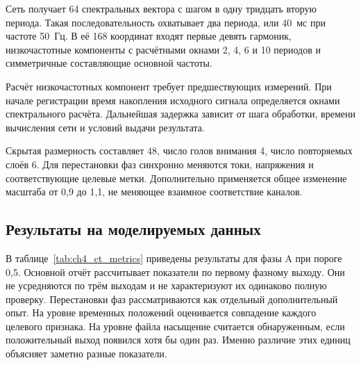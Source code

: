 Сеть получает 64 спектральных вектора с шагом в одну тридцать вторую периода. Такая
последовательность охватывает два периода, или 40~мс при частоте 50~Гц. В её 168
координат входят первые девять гармоник, низкочастотные компоненты с расчётными окнами
2, 4, 6 и 10 периодов и симметричные составляющие основной частоты.

Расчёт низкочастотных компонент требует предшествующих измерений. При начале регистрации
время накопления исходного сигнала определяется окнами спектрального расчёта. Дальнейшая
задержка зависит от шага обработки, времени вычисления сети и условий выдачи результата.

Скрытая размерность составляет 48,
число голов внимания 4, число повторяемых слоёв 6.
Для перестановки фаз синхронно меняются токи,
напряжения и соответствующие целевые метки.
Дополнительно применяется общее изменение масштаба
от 0,9 до 1,1, не меняющее взаимное соответствие каналов.

\subsection{Результаты на моделируемых данных}
\label{sec:ch4_ct_results}

В таблице~\ref{tab:ch4_ct_metrics} приведены
результаты для фазы A при пороге 0,5. Основной отчёт
рассчитывает показатели по первому фазному выходу.
Они не усредняются по трём выходам и не характеризуют
их одинаково полную проверку. Перестановки фаз
рассматриваются как отдельный дополнительный опыт.
На уровне временных положений оценивается
совпадение каждого целевого признака.
На уровне файла насыщение считается обнаруженным,
если положительный выход появился хотя бы один раз.
Именно различие этих единиц объясняет
заметно разные показатели.

